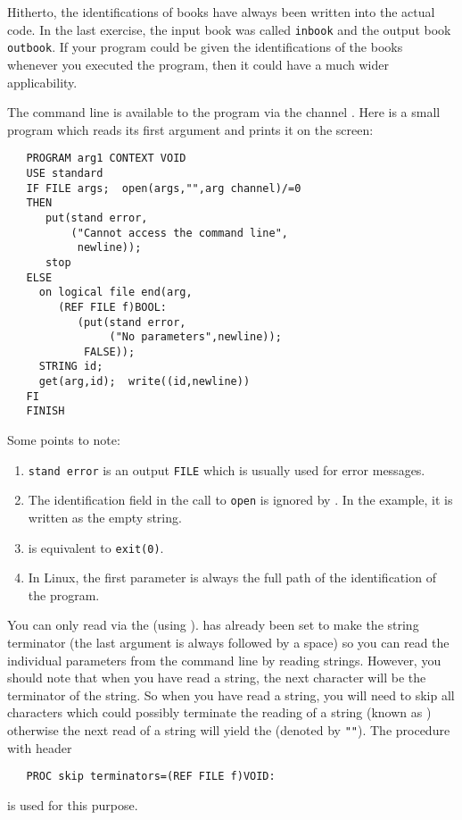 Hitherto, the identifications of books have always been written into
the actual code. In the last exercise, the input book was called
\verb|inbook| and the output book \verb|outbook|. If your program
could be given the identifications of the books whenever you executed
the program, then it could have a much wider applicability.

The command line is available to the program via the channel
. Here is a small program which reads
its first argument and prints it on the screen:
\begin{verbatim}
   PROGRAM arg1 CONTEXT VOID
   USE standard
   IF FILE args;  open(args,"",arg channel)/=0
   THEN
      put(stand error,
          ("Cannot access the command line",
           newline));
      stop
   ELSE
     on logical file end(arg,
        (REF FILE f)BOOL:
           (put(stand error,
                ("No parameters",newline));
            FALSE));
     STRING id;
     get(arg,id);  write((id,newline))
   FI
   FINISH
\end{verbatim}
\noindent
Some points to note:
\begin{enumerate}
\item \verb|stand error| is an output \verb|FILE| which is usually used
for error messages.
\item The identification field in the call to \verb|open| is ignored
by . In the example, it is written as
the empty string.
\item {} is equivalent to \verb|exit(0)|.
\item In Linux, the first parameter is always the full path of the
identification of the program.
\end{enumerate}
You can only read via the  (using
).  has already been set to make the string
terminator  (the last argument is always followed by a
space) so you can read the individual parameters from the command line
by reading strings.  However, you should note that when you have read a
string, the next character will be the terminator of the string. So
when you have read a string, you will need to skip all characters which
could possibly terminate the reading of a string (known as
) otherwise the next read of a string will yield the
 (denoted by \verb|""|). The procedure
 with header
\begin{verbatim}
   PROC skip terminators=(REF FILE f)VOID:
\end{verbatim}
\noindent
is used for this purpose.

